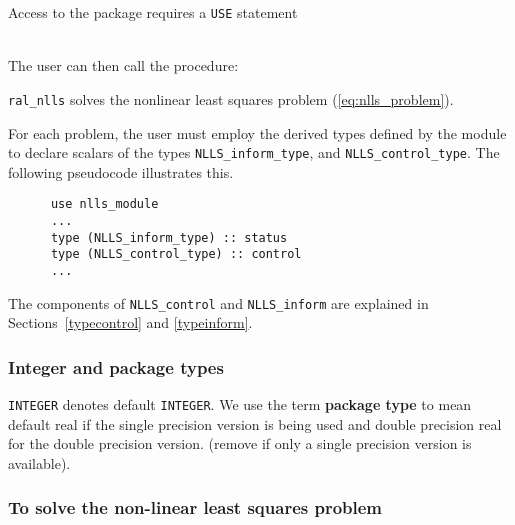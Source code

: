 \documentclass{hslspec}
\begin{document}
Access to the package requires a {\tt USE} statement \\ \\
\indent\hspace{5mm}{\tt use nlls\_module} 
\medskip

\noindent The user can then call the procedure:
\vspace{-0.1cm}
\begin{description}
\item {\tt ral\_nlls}  solves the nonlinear least squares problem (\ref{eq:nlls_problem}).
\end{description}


\hsltypes
\label{derived types}
For each problem, the user must employ the derived types defined by the
module to declare scalars of the types {\tt NLLS\_inform\_type}, and
{\tt NLLS\_control\_type}.
The following pseudocode illustrates this.
\begin{verbatim}
      use nlls_module
      ...
      type (NLLS_inform_type) :: status
      type (NLLS_control_type) :: control
      ...
\end{verbatim}
The components of {\tt NLLS\_control} and {\tt NLLS\_inform} are explained
in Sections~\ref{typecontrol} and \ref{typeinform}. 


\hslarguments

\subsubsection{Integer and package types}
{\tt INTEGER} denotes default {\tt INTEGER}.
We use the term {\bf package type} to mean
default real if the single precision version is being used and
double precision real for the double precision version. {\color{red} (remove if only a single precision version is available).}

\subsubsection{To solve the non-linear least squares problem}
\label{sec:factorize}
\end{document}

